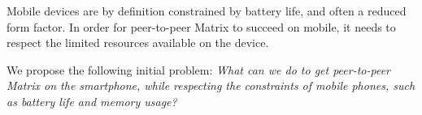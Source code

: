 \noindent Mobile devices are by definition constrained by battery life, and often a reduced form factor.
In order for peer-to-peer Matrix to succeed on mobile, it needs to respect the limited resources available on the device.


\begin{center}
    We propose the following initial problem: \textit{What can we do to get peer-to-peer Matrix on the smartphone, while respecting the constraints of mobile phones, such as battery life and memory usage?}
\end{center}

